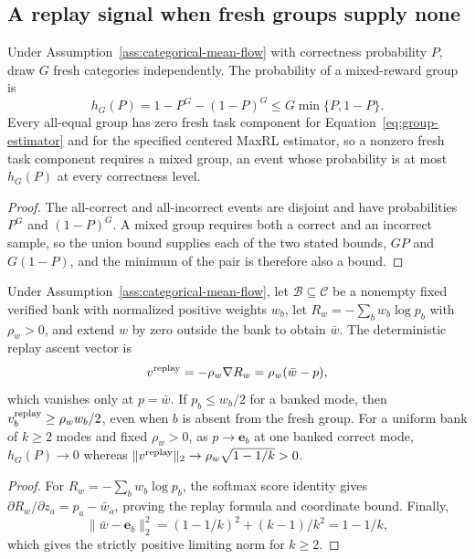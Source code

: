 \subsection{A replay signal when fresh groups supply none}
\label{app:theory-gradient-availability}

\begin{lemma}
\enforcehalffinalproseline
\label{lem:replay-gradient-availability}
Under Assumption~\ref{ass:categorical-mean-flow} with correctness probability
$P$, draw $G$ fresh categories independently. The probability of a
mixed-reward group is
\[
 h_G(P)=1-P^G-(1-P)^G\le G\min\{P,1-P\}.
\]
Every all-equal group has zero fresh task component for
Equation~\eqref{eq:group-estimator} and for the specified centered MaxRL
estimator, so a nonzero fresh task component requires a mixed group, an event
whose probability is at most $h_G(P)$ at every correctness level.
\end{lemma}

\begin{proof}
\enforcehalffinalproseline
The all-correct and all-incorrect events are disjoint and have probabilities
$P^G$ and $(1-P)^G$. A mixed group requires both a correct and an incorrect
sample, so the union bound supplies each of the two stated bounds, $GP$ and
$G(1-P)$, and the minimum of the pair is therefore also a bound.
\end{proof}

\begin{lemma}
\enforcehalffinalproseline
\label{lem:replay-ascent}
Under Assumption~\ref{ass:categorical-mean-flow}, let
$\mathcal B\subseteq\mathcal C$ be a nonempty fixed verified bank with
normalized positive weights $w_b$, let $R_w=-\sum_b w_b\log p_b$ with
$\rho_w>0$, and extend $w$ by zero outside the bank to obtain $\bar w$. The
deterministic replay ascent vector is
\[
 v^{\rm replay}=-\rho_w\nabla R_w=\rho_w(\bar w-p),
\]
which vanishes only at $p=\bar w$. If $p_b\le w_b/2$ for a banked mode, then
$v^{\rm replay}_b\ge\rho_w w_b/2$, even when $b$ is absent from the fresh
group. For a uniform bank of $k\ge2$ modes and fixed $\rho_w>0$, as
$p\to\mathbf e_b$ at one banked correct mode, $h_G(P)\to0$ whereas
$\|v^{\rm replay}\|_2\to\rho_w\sqrt{1-1/k}>0$.
\end{lemma}

\begin{proof}
\enforcehalffinalproseline
For $R_w=-\sum_b w_b\log p_b$, the softmax score identity gives
$\partial R_w/\partial z_a=p_a-\bar w_a$, proving the replay formula and
coordinate bound. Finally,
\[
 \|\bar w-\mathbf e_b\|_2^2=(1-1/k)^2+(k-1)/k^2=1-1/k,
\]
which gives the strictly positive limiting norm for $k\ge2$.
\end{proof}

